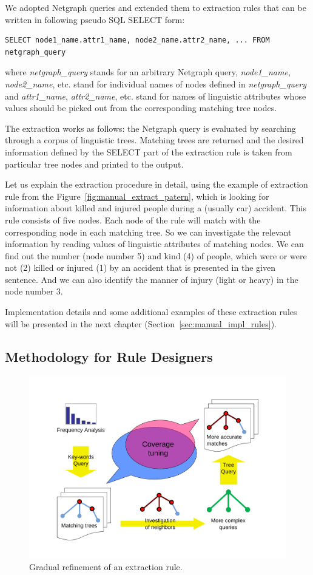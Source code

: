 We adopted Netgraph queries and extended them to extraction rules that can be written in following pseudo SQL SELECT form:

\begin{verbatim}
SELECT node1_name.attr1_name, node2_name.attr2_name, ... FROM netgraph_query
\end{verbatim}

where \emph{netgraph\_query} stands for an arbitrary Netgraph query, \emph{node1\_name}, \emph{node2\_name}, etc. stand for individual names of nodes defined in \emph{netgraph\_query} and \emph{attr1\_name}, \emph{attr2\_name}, etc. stand for names of linguistic attributes whose values should be picked out from the corresponding matching tree nodes.

The extraction works as follows: the Netgraph query is evaluated by searching through a corpus of linguistic trees. Matching trees are returned and the desired information defined by the SELECT part of the extraction rule is taken from particular tree nodes and printed to the output.

Let us explain the extraction procedure in detail, using the example of extraction rule from the Figure~\ref{fig:manual_extract_patern}, which is looking for information about killed and injured people during a (usually car) accident. This rule consists of five nodes. Each node of the rule will match with the corresponding node in each matching tree. So we can investigate the relevant information by reading values of linguistic attributes of matching nodes. We can find out the number (node number 5) and kind (4) of people, which were or were not (2) killed or injured (1) by an accident that is presented in the given sentence. And we can also identify the manner of injury (light or heavy) in the node number 3.

Implementation details and some additional examples of these extraction rules will be presented in the next chapter (Section~\ref{sec:manual_impl_rules}).



\subsection{Methodology for Rule Designers} \label{sec:manual_rules_design}

\begin{figure}
	\centering
		\includegraphics[angle=-90, width=0.5\hsize]{coverge_tuning}
	\caption{Gradual refinement of an extraction rule.}
	\label{fig:manual_coverge_tuning}
\end{figure}


